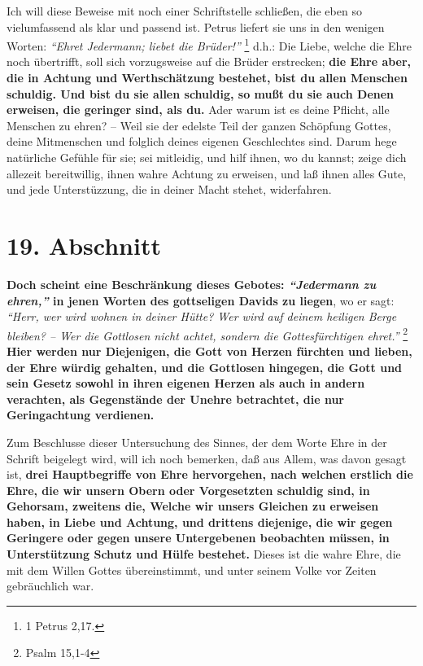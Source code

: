 Ich will diese Beweise mit noch einer Schriftstelle schließen, die eben so
vielumfassend als klar und passend ist. Petrus liefert sie uns in den
wenigen Worten:
\textit{"`Ehret Jedermann; liebet die Brüder!"'}
\footnote{1 Petrus 2,17.}
d.h.: Die Liebe, welche die Ehre noch übertrifft, soll sich vorzugsweise auf die
Brüder erstrecken; \textbf{die Ehre aber, die in Achtung und Werthschätzung
bestehet,
bist du allen Menschen schuldig. Und bist du sie allen schuldig, so mußt du sie
auch Denen erweisen, die geringer sind, als du.} Ader warum
ist es deine Pflicht,
alle Menschen zu ehren? -- Weil sie der edelste Teil der ganzen Schöpfung
Gottes, deine Mitmenschen und folglich deines eigenen Geschlechtes sind. Darum
hege natürliche Gefühle für sie; sei mitleidig, und hilf ihnen, wo du kannst;
zeige dich allezeit bereitwillig, ihnen wahre Achtung zu erweisen, und laß ihnen
alles Gute, und jede Unterstüzzung, die in deiner Macht stehet, widerfahren.

\section{19. Abschnitt} \label{kap9_ab19}

 \textbf{Doch scheint eine Beschränkung dieses
Gebotes:
\textit{"`Jedermann zu ehren,"'} in jenen
Worten des gottseligen Davids zu liegen}, wo er sagt:
\textit{"`Herr, wer wird wohnen
in deiner Hütte? Wer wird auf deinem heiligen Berge bleiben? -- Wer die
Gottlosen nicht achtet, sondern die Gottesfürchtigen ehret."'}
\footnote{Psalm 15,1-4}
\textbf{Hier werden nur Diejenigen, die Gott von Herzen fürchten und lieben, der
Ehre würdig gehalten, und die Gottlosen hingegen,
die Gott und sein Gesetz
sowohl in ihren eigenen Herzen als auch in andern verachten, als Gegenstände der
Unehre betrachtet, die nur Geringachtung verdienen.}

\medskip

Zum Beschlusse dieser Untersuchung des Sinnes, der dem Worte Ehre in der Schrift
beigelegt wird, will ich noch bemerken, daß aus Allem, was davon gesagt ist,
\textbf{drei Hauptbegriffe von Ehre hervorgehen, nach welchen erstlich die Ehre,
die wir
unsern Obern oder Vorgesetzten schuldig sind, in Gehorsam, zweitens die, Welche
wir unsers Gleichen zu erweisen haben, in Liebe und Achtung, und drittens
diejenige, die wir gegen Geringere oder gegen unsere Untergebenen beobachten
müssen, in Unterstützung Schutz und Hülfe bestehet.} Dieses ist die wahre Ehre,
die mit dem Willen Gottes übereinstimmt, und unter seinem Volke vor Zeiten
gebräuchlich war.


